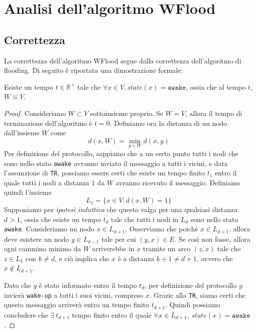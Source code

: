 \section{Analisi dell'algoritmo WFlood}

\subsection{Correttezza}

La correttezza dell'algoritmo WFlood segue dalla correttezza dell'algoritmo di flooding. Di seguito è riportata una dimostrazione formale:
\begin{teorema}
    Esiste un tempo $t \in \mathbb{R}^+$ tale che $\forall x \in V, state(x) = \texttt{awake}$, ossia che al tempo $t$, $W \equiv V$.
    \begin{proof}
        Consideriamo $W \subset V$ sottoinsieme proprio. Se $ W = V $, allora il tempo di terminazione dell'algoritmo è $t = 0$. Definiamo ora la distanza di un nodo dall'insieme $W$ come
        \[
            d(x, W) = \min_{y \in W} d(x, y)
        \]
        Per definizione del protocollo, sappiamo che a un certo punto tutti i nodi che sono nello stato \texttt{awake} avranno inviato il messaggio a tutti i vicini, e data l'assunzione di \texttt{TR}, possiamo essere certi che esiste un tempo finito $t_1$ entro il quale tutti i nodi a distanza $1$ da $W$ avranno ricevuto il messaggio. Definiamo quindi l'insieme
        \[
            L_1 = \{x \in V: d(x, W) = 1\}
        \]
        Supponiamo per \textit{ipotesi induttiva} che questo valga per una qualsiasi distanza $d > 1$, ossia che esiste un tempo $t_d$ tale che tutti i nodi in $L_d$ sono nello stato \texttt{awake}. Consideriamo un nodo $x \in L_{d + 1}$. Osserviamo che poichè $x \in L_{d + 1}$, allora deve esistere un nodo $y \in L_{d-1}$ tale per cui $(y, x) \in E$. Se così non fosse, allora ogni cammino minimo da $W$ arriverebbe in $x$ tramite un arco $(z, x)$ tale che $z \in L_k$ con $k \neq d$, e ciò implica che $x$ è a distanza $k + 1 \neq d + 1$, ovvero che $x \not \in L_{d+1}$. 

        Dato che $y$ è stato informato entro il tempo $t_d$, per definizione del protocollo $y$ invierà \texttt{wake-up} a tutti i suoi vicini, compreso $x$. Grazie alla \texttt{TR}, siamo certi che questo messaggio arriverà entro un tempo finito $t_{d+1}$. Quindi possiamo concludere che $\exists\ t_{d+1}$ tempo finito entro il quale $\forall x \in L_{d+1},\ state(x) = \texttt{awake}$.
    \end{proof}
\end{teorema}

